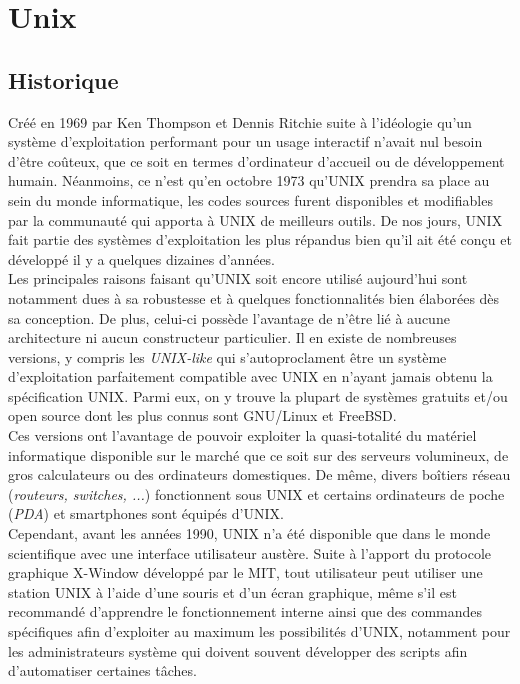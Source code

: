 \section{Unix}
\subsection{Historique}
Créé en 1969 par Ken Thompson et Dennis Ritchie suite à l'idéologie qu'un
système d'exploitation performant pour un usage interactif n'avait nul besoin
d'être coûteux, que ce soit en termes d'ordinateur d'accueil ou de développement
humain. Néanmoins, ce n'est qu'en octobre 1973 qu'UNIX prendra sa place au sein
du monde informatique, les codes sources furent disponibles et modifiables par
la communauté qui apporta à UNIX de meilleurs outils. De nos jours, UNIX fait
partie des systèmes d'exploitation les plus répandus bien qu'il ait été conçu
et développé il y a quelques dizaines d'années. \\

Les principales raisons faisant qu'UNIX soit encore utilisé aujourd'hui sont
notamment dues à sa robustesse et à quelques fonctionnalités bien élaborées dès
sa conception. De plus, celui-ci possède l'avantage de n'être lié à aucune
architecture ni aucun constructeur particulier. Il en existe de nombreuses versions,
y compris les \textit{UNIX-like} qui s'autoproclament être un système
d'exploitation parfaitement compatible avec UNIX en n'ayant jamais obtenu la
spécification UNIX. Parmi eux, on y trouve la plupart de systèmes gratuits
et/ou open source dont les plus connus sont GNU/Linux et FreeBSD. \\

Ces versions ont l'avantage de pouvoir exploiter la quasi-totalité du matériel
informatique disponible sur le marché que ce soit sur des serveurs volumineux,
de gros calculateurs ou des ordinateurs domestiques. De même, divers boîtiers
réseau (\textit{routeurs, switches, ...}) fonctionnent sous UNIX et certains
ordinateurs de poche (\textit{PDA}) et smartphones sont équipés d'UNIX. \\

Cependant, avant les années 1990, UNIX n'a été disponible que dans le monde
scientifique avec une interface utilisateur austère. Suite à l'apport du
protocole graphique X-Window développé par le MIT, tout utilisateur peut
utiliser une station UNIX à l'aide d'une souris et d'un écran graphique, même
s'il est recommandé d'apprendre le fonctionnement interne ainsi que des
commandes spécifiques afin d'exploiter au maximum les possibilités d'UNIX,
notamment pour les administrateurs système qui doivent souvent développer des
scripts afin d'automatiser certaines tâches. \\

